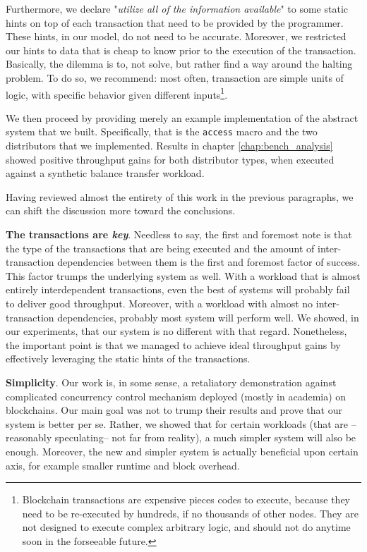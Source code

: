 Furthermore, we declare "\textit{utilize all of the information available}" to some static hints on
top of each transaction that need to be provided by the programmer. These hints, in our model, do
not need to be accurate. Moreover, we restricted our hints to data that is cheap to know prior to
the execution of the transaction. Basically, the dilemma is to, not solve, but rather find a way
around the halting problem. To do so, we recommend: most often, transaction are simple units of
logic, with specific behavior given different inputs\footnote{Blockchain transactions are expensive
pieces codes to execute, because they need to be re-executed by hundreds, if no thousands of other
nodes. They are not designed to execute complex arbitrary logic, and should not do anytime soon in
the forseeable future.}.


We then proceed by providing merely an example implementation of the abstract system that we built.
Specifically, that is the \texttt{access} macro and the two distributors that we implemented.
Results in chapter \ref{chap:bench_analysis} showed positive throughput gains for both distributor
types, when executed against a synthetic balance transfer workload.


Having reviewed almost the entirety of this work in the previous paragraphs, we can shift the
discussion more toward the conclusions.

\textbf{The transactions are \textit{key}}. Needless to say, the first and foremost note is that the
type of the transactions that are being executed and the amount of inter-transaction dependencies
between them is the first and foremost factor of success. This factor trumps the underlying system
as well. With a workload that is almost entirely interdependent transactions, even the best of
systems will probably fail to deliver good throughput. Moreover, with a workload with almost no
inter-transaction dependencies, probably most system will perform well. We showed, in our
experiments, that our system is no different with that regard. Nonetheless, the important point is
that we managed to achieve ideal throughput gains by effectively leveraging the static hints of the
transactions.

\textbf{Simplicity}. Our work is, in some sense, a retaliatory demonstration against complicated
concurrency control mechanism deployed (mostly in academia) on blockchains. Our main goal was not to
trump their results and prove that our system is better per se. Rather, we showed that for certain
workloads (that are --reasonably speculating-- not far from reality), a much simpler system will
also be enough. Moreover, the new and simpler system is actually beneficial upon certain axis, for
example smaller runtime and block overhead.

